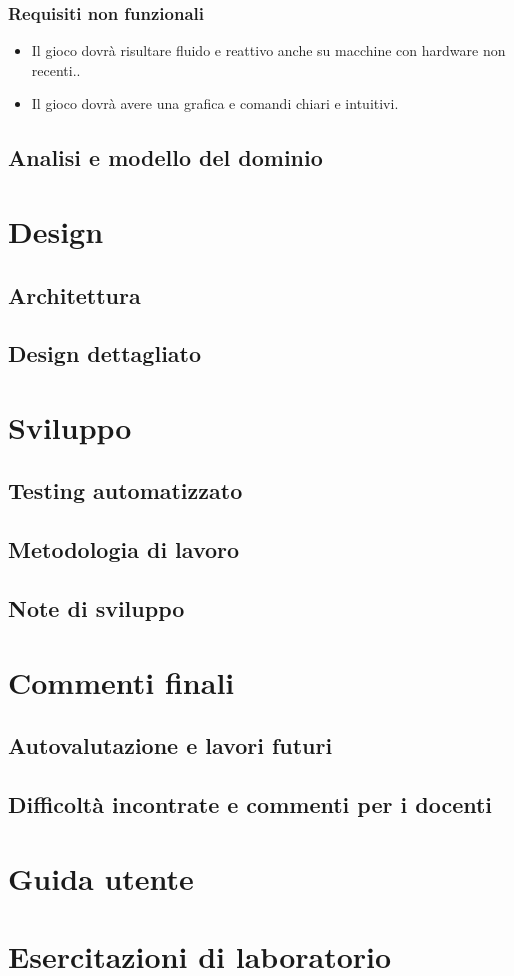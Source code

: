 \documentclass[a4paper,12pt]{report}
\begin{document}
	\subsection{Requisiti non funzionali}
	\begin{itemize}
		\item Il gioco dovrà risultare fluido e reattivo anche su macchine con hardware non recenti..
		\item Il gioco dovrà avere una grafica e comandi chiari e intuitivi.
	\end{itemize}
	\section{Analisi e modello del dominio}
	\chapter{Design}
	\section{Architettura}
	\section{Design dettagliato}
	\chapter{Sviluppo}
	\section{Testing automatizzato}
	\section{Metodologia di lavoro}
	\section{Note di sviluppo}
	\chapter{Commenti finali}
	\section{Autovalutazione e lavori futuri}
	\section{Difficoltà incontrate e commenti per i docenti}
	\appendix
	\chapter{Guida utente}
	\chapter{Esercitazioni di laboratorio}
	\printbibliography[heading=bibintoc]
\end{document}
